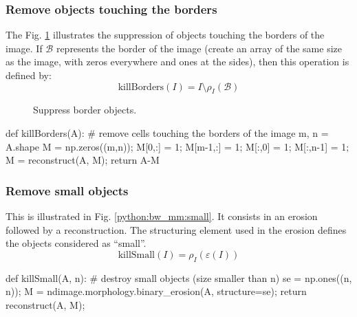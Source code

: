 \subsubsection{Remove objects touching the borders}
The Fig. \ref{python:bw_mm:borders} illustrates the suppression of objects touching the borders of the image. If $\mathcal{B}$ represents the border of the image (create an array of the same size as the image, with zeros everywhere and ones at the sides), then this operation is defined by:
\[ \textrm{killBorders}(I) = I\setminus \rho_I(\mathcal{B})\]
\vspace*{-10pt}%
\begin{figure}[htbp]
	\centering\caption{Suppress border objects.}%
	\hfill
	\label{python:bw_mm:borders}%
	\vspace*{-8pt}%
\end{figure}

\begin{python}
def killBorders(A):
    # remove cells touching the borders of the image
    m, n = A.shape
    M = np.zeros((m,n));
    M[0,:] = 1;
    M[m-1,:] = 1;
    M[:,0] = 1;
    M[:,n-1] = 1;
    M = reconstruct(A, M);
    return A-M
\end{python}


\subsubsection{Remove small objects}
This is illustrated in Fig. \ref{python:bw_mm:small}. It consists in an erosion followed by a reconstruction. The structuring element used in the erosion defines the objects considered as ``small''.
\[\textrm{killSmall}(I)=\rho_I(\varepsilon(I)) \]
\begin{python}
def killSmall(A, n):
    # destroy small objects (size smaller than n)
    se = np.ones((n, n));
    M = ndimage.morphology.binary_erosion(A, structure=se);
    return reconstruct(A, M);
\end{python}

